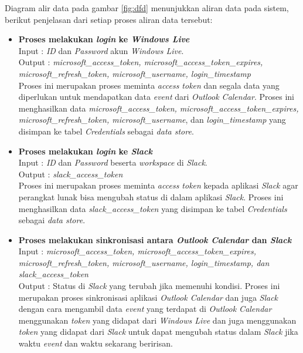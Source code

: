 Diagram alir data pada gambar \ref{fig:dfd} menunjukkan aliran data pada sistem, berikut penjelasan dari setiap proses aliran data tersebut:
\begin{itemize}
    \item \textbf{Proses melakukan \textit{login} ke \textit{Windows Live}}\\
    Input : \textit{ID} dan \textit{Password} akun \textit{Windows Live}.\\
    Output : \textit{microsoft\_access\_token, microsoft\_access\_token\_expires, microsoft\_refresh\_token, microsoft\_username, login\_timestamp}\\
    Proses ini merupakan proses meminta \textit{access token} dan segala data yang diperlukan untuk mendapatkan data \textit{event} dari \textit{Outlook Calendar}. Proses ini menghasilkan data \textit{microsoft\_access\_token, microsoft\_access\_token\_expires, microsoft\_refresh\_token, microsoft\_username}, dan \textit{login\_timestamp} yang disimpan ke tabel \textit{Credentials} sebagai \textit{data store}. 
    \item \textbf{Proses melakukan \textit{login} ke \textit{Slack}}\\
    Input : \textit{ID} dan \textit{Password} beserta \textit{workspace} di \textit{Slack}.\\
    Output : \textit{slack\_access\_token}\\
    Proses ini merupakan proses meminta \textit{access token} kepada aplikasi \textit{Slack} agar perangkat lunak bisa mengubah status di dalam aplikasi \textit{Slack}. Proses ini menghasilkan data \textit{slack\_access\_token} yang disimpan ke tabel \textit{Credentials} sebagai \textit{data store}. 
    \item \textbf{Proses melakukan sinkronisasi antara \textit{Outlook Calendar} dan \textit{Slack}}\\
    Input : \textit{microsoft\_access\_token, microsoft\_access\_token\_expires, microsoft\_refresh\_token, microsoft\_username, login\_timestamp, dan slack\_access\_token}\\
    Output : Status di \textit{Slack} yang terubah jika memenuhi kondisi. 
    Proses ini merupakan proses sinkronisasi aplikasi \textit{Outlook Calendar} dan juga \textit{Slack} dengan cara mengambil data \textit{event} yang terdapat di \textit{Outlook Calendar} menggunakan \textit{token} yang didapat dari \textit{Windows Live} dan juga menggunakan \textit{token} yang didapat dari \textit{Slack} untuk dapat mengubah status dalam \textit{Slack} jika waktu \textit{event} dan waktu sekarang beririsan. 
\end{itemize}

